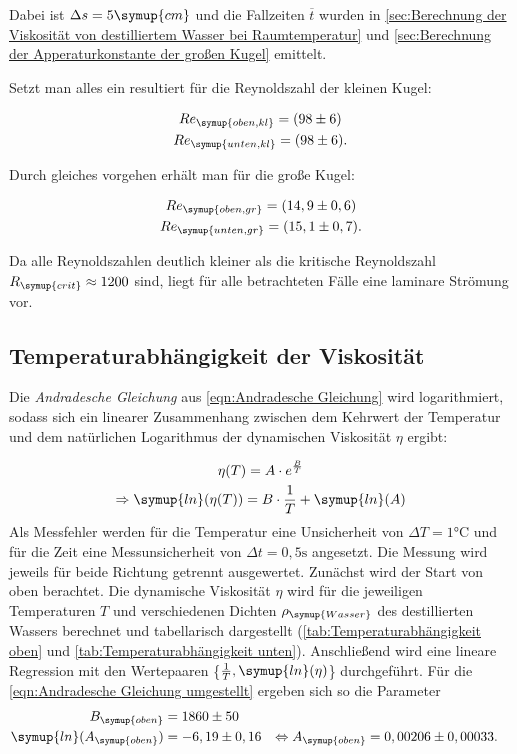 Dabei ist $\Delta s=5\symup{cm}$ und die Fallzeiten $\overline{t}$ wurden in
\autoref{sec:Berechnung der Viskosität von destilliertem Wasser bei Raumtemperatur} und
\autoref{sec:Berechnung der Apperaturkonstante der großen Kugel} emittelt.

Setzt man alles ein resultiert für die Reynoldszahl der kleinen Kugel:

\begin{gather}
  Re_{\symup{oben,kl}} = (98\pm6) \notag \\
  Re_{\symup{unten,kl}} = (98\pm6) \notag .
\end{gather}

Durch gleiches vorgehen erhält man für die große Kugel:

\begin{gather}
  Re_{\symup{oben,gr}} = (14,9\pm0,6) \notag \\
  Re_{\symup{unten,gr}} = (15,1\pm0,7) \notag .
\end{gather}

Da alle Reynoldszahlen deutlich kleiner als die kritische Reynoldszahl $R_{\symup{crit}}\approx 1200$ sind, liegt für alle 
betrachteten Fälle eine laminare Strömung vor.

\subsection{Temperaturabhängigkeit der Viskosität}
\label{sec:Temperaturabhängigkeit der Viskosität}
Die \textit{Andradesche Gleichung} aus \autoref{eqn:Andradesche Gleichung} wird logarithmiert, sodass sich ein linearer Zusammenhang
zwischen dem Kehrwert der Temperatur und dem natürlichen Logarithmus der dynamischen Viskosität $\eta$ ergibt:

\begin{gather}
  \eta (T)=A\cdot e^{\frac{B}{T}} \\
  \Rightarrow \symup{ln}(\eta(T)) = B \cdot \frac{1}{T} + \symup{ln}(A) \label{eqn:Andradesche Gleichung umgestellt}
\end{gather}
Als Messfehler werden für die Temperatur eine Unsicherheit von $\Delta T = 1 \unit{\celsius}$ und für die Zeit 
eine Messunsicherheit von $\Delta t = 0,5 \unit{\second}$ angesetzt.
Die Messung wird jeweils für beide Richtung getrennt ausgewertet. Zunächst wird der Start von oben berachtet.
Die dynamische Viskosität $\eta$ wird für die jeweiligen Temperaturen $T$ und verschiedenen Dichten $\rho_{\symup{Wasser}}$ 
des destillierten Wassers berechnet und tabellarisch dargestellt (\autoref{tab:Temperaturabhängigkeit oben} 
und \autoref{tab:Temperaturabhängigkeit unten}). Anschließend wird eine lineare Regression mit den Wertepaaren 
\{$\frac{1}{T}, \symup{ln}(\eta)$\} durchgeführt. Für die \autoref{eqn:Andradesche Gleichung umgestellt} ergeben sich so die Parameter
\begin{align}
  B_{\symup{oben}}&=1860\pm50 \\
  \symup{ln}(A_{\symup{oben}}) &= -6,19\pm0,16 &\Leftrightarrow A_{\symup{oben}}&=0,00206\pm0,00033 .
\end{align}

